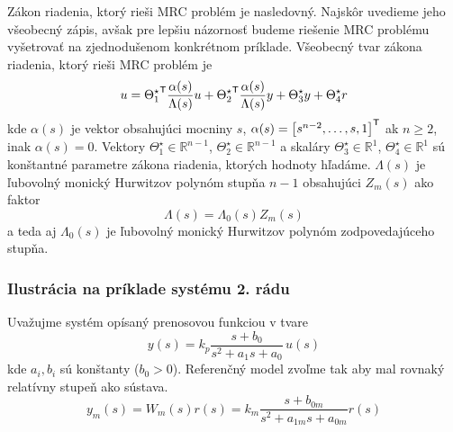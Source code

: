 \documentclass[a4paper, 10pt, ]{article}
\begin{document}
Zákon riadenia, ktorý rieši MRC problém je nasledovný. Najskôr uvedieme jeho všeobecný zápis, avšak pre lepšiu názornosť budeme riešenie MRC problému vyšetrovať na zjednodušenom konkrétnom príklade. Všeobecný tvar zákona riadenia, ktorý rieši MRC problém je
\begin{equation} \label{generalControlLaw}
    u = {\Theta_1^\star}^{\mathsf{T}} \frac{\alpha(s)}{\Lambda(s)} u + {\Theta_2^\star}^{\mathsf{T}} \frac{\alpha(s)}{\Lambda(s)} y + \Theta_3^\star y + \Theta_4^\star r
\end{equation}
kde $\alpha(s)$ je vektor obsahujúci mocniny $s$, $\alpha(s) = \begin{bmatrix} s^{n-2}, \ldots,s, 1 \end{bmatrix}^{\mathsf{T}}$ ak $n\geq 2$, inak $\alpha(s) = 0$. Vektory $\Theta_1^\star \in \mathbb{R}^{n-1}$, $\Theta_2^\star \in \mathbb{R}^{n-1}$ a skaláry $\Theta_3^\star \in \mathbb{R}^1$, $\Theta_4^\star \in \mathbb{R}^1$ sú konštantné parametre zákona riadenia, ktorých hodnoty hľadáme.  $\Lambda(s)$ je ľubovolný monický Hurwitzov polynóm stupňa $n-1$ obsahujúci $Z_m(s)$ ako faktor
\begin{equation}
	\Lambda(s) = \Lambda_0(s) Z_m(s)
\end{equation}
a teda aj $\Lambda_0(s)$ je ľubovolný monický Hurwitzov polynóm zodpovedajúceho stupňa.

















\subsubsection{Ilustrácia na príklade systému 2. rádu}
\label{MRCproblemPriklad}



Uvažujme systém opísaný prenosovou funkciou v tvare
\begin{equation} \label{genaralFormOfPlant04}
	y(s) = k_p \frac{s + b_0}{ s^2 + a_1 s + a_0} \, u(s)
\end{equation}
kde $a_i, b_i$ sú konštanty ($b_0 > 0$). Referenčný model zvoľme tak aby mal rovnaký relatívny stupeň ako sústava.
\begin{equation}
	y_m(s) = W_m(s)r(s) = k_m \frac{s + b_{0m}}{ s^2 + a_{1m} s + a_{0m}} r(s)
\end{equation}
\end{document}

